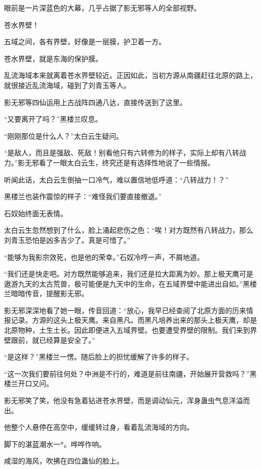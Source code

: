 
\begin{this_body}

眼前是一片深蓝色的大幕，几乎占据了影无邪等人的全部视野。

苍水界壁！

五域之间，各有界壁，好像是一层膜，护卫着一方。

苍水界壁，就是东海的保护膜。

乱流海域本来就离着苍水界壁较近。正因如此，当初方源从南疆赶往北原的路上，就很接近乱流海域，碰到了刘青玉等人。

影无邪等四仙运用上古战阵四通八达，直接传送到了这里。

“又要离开了吗？”黑楼兰叹息。

“刚刚那位是什么人？”太白云生疑问。

“是敌人，而且是强敌、死敌！别看他只有六转修为的样子，实际上却有八转战力。”影无邪看了一眼太白云生，终究还是有选择性地说了一些情报。

听闻此话，太白云生倒抽一口冷气，难以置信地低呼道：“八转战力！？”

黑楼兰也装作震惊的样子：“难怪我们要直接撤退。”

石奴始终面无表情。

太白云生忽然想到了什么，脸上涌起悲伤之色：“唉！对方既然有八转战力，那么刘青玉恐怕是凶多吉少了。真是可惜了。”

“能够为我影宗效死，也是他的荣幸。”石奴冷哼一声，不屑地道。

“我们还是快走吧。对方既然能够追来，我们还是拉大距离为妙。那上极天鹰可是遨游九天的太古荒兽，极可能便是九天中的生命，在五域界壁中能进出自如。”黑楼兰暗暗传音，提醒影无邪。

影无邪深深地看了她一眼，传音回道：“放心，我早已经查阅了北原方面的历来情报记录。方源的这头上极天鹰。来自黑凡。而黑凡培养出来的那头上极天鹰，却是北原物种，土生土长。因此即便进入五域界壁。也要遭受界壁的限制。我们来到界壁跟前，就已经算是安全了。”

“是这样？”黑楼兰一愣。随后脸上的担忧缓解了许多的样子。

“这一次我们要前往何处？中洲是不行的，难道是前往南疆，开始展开营救吗？”黑楼兰开口又问。

影无邪笑了笑，他没有急着钻进苍水界壁，而是调动仙元，浑身蛊虫气息洋溢而出。

他整个人悬停在高空中，缓缓转过身，看着乱流海域的方向。

脚下的湛蓝潮水一*。哗哗作响。

咸湿的海风，吹拂在四位蛊仙的脸上。


\end{this_body}
